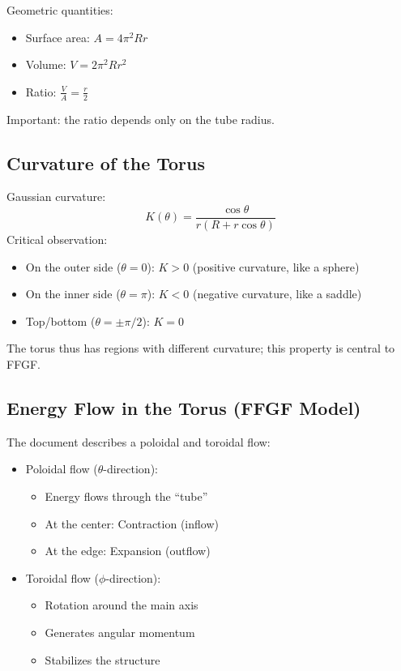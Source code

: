 Geometric quantities:
\begin{itemize}
	\item Surface area: \( A = 4\pi^2 R r \)
	\item Volume: \( V = 2\pi^2 R r^2 \)
	\item Ratio: \( \frac{V}{A} = \frac{r}{2} \)
\end{itemize}
Important: the ratio depends only on the tube radius.

\subsection{Curvature of the Torus}
Gaussian curvature:
\[
K(\theta) = \frac{\cos \theta}{r(R + r \cos \theta)}
\]
Critical observation:
\begin{itemize}
	\item On the outer side (\( \theta = 0 \)): \( K > 0 \) (positive curvature, like a sphere)
	\item On the inner side (\( \theta = \pi \)): \( K < 0 \) (negative curvature, like a saddle)
	\item Top/bottom (\( \theta = \pm\pi/2 \)): \( K = 0 \)
\end{itemize}
The torus thus has regions with different curvature; this property is central to FFGF.

\subsection{Energy Flow in the Torus (FFGF Model)}
The document describes a poloidal and toroidal flow:
\begin{itemize}
	\item Poloidal flow (\( \theta \)-direction):
	\begin{itemize}
		\item Energy flows through the ``tube''
		\item At the center: Contraction (inflow)
		\item At the edge: Expansion (outflow)
	\end{itemize}
	\item Toroidal flow (\( \phi \)-direction):
	\begin{itemize}
		\item Rotation around the main axis
		\item Generates angular momentum
		\item Stabilizes the structure
	\end{itemize}
\end{itemize}

